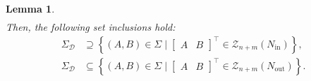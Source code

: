 \documentclass[journal,twoside,web]{ieeecolor}
\newcommand{\set}[2]{\left\{#1 \mid #2\right\}}
\newtheorem{lemma}[theorem]{Lemma}
\begin{document}
\begin{lemma}
\begin{subequations}
\begin{align}
\end{align}
\end{subequations}
Then, the following set inclusions hold:
\begin{subequations}
\begin{align}
\label{eq:lem:exp_qmi-2}
\Sigma_\mathcal{D}&\supseteq\set{(A,B)\in\Sigma}{\begin{bmatrix}
A & B
\end{bmatrix}^\top\in\mathcal{Z}_{n+m}(N_\text{in})},\\
\label{eq:lem:exp_qmi-1}
\Sigma_\mathcal{D}&\subseteq \set{(A,B)\in\Sigma}{\begin{bmatrix}
A & B
\end{bmatrix}^\top\in\mathcal{Z}_{n+m}(N_\text{out})}.
\end{align}
\end{subequations}
\end{lemma}\vspace{0.25 cm}
\end{document}
